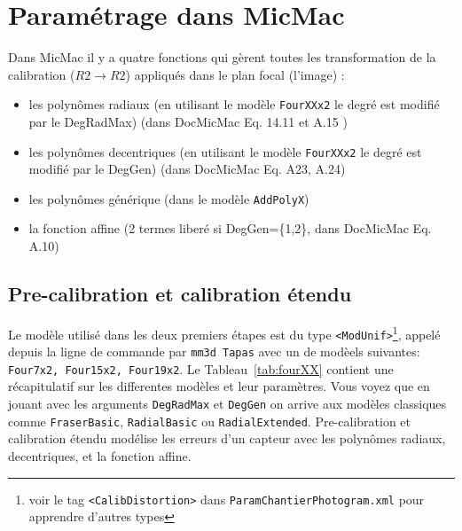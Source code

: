\documentclass[11pt,a4paper,oneside]{book}
\begin{document}
\section{Paramétrage dans MicMac}
%
Dans MicMac il y a quatre fonctions qui gèrent toutes les transformation de la calibration ($R2 \rightarrow R2$) appliqués dans le plan focal (l'image) :
\begin{itemize}
\item les polynômes radiaux (en utilisant le modèle {\tt FourXXx2} le degré est modifié par le DegRadMax) (dans DocMicMac Eq. 14.11 et A.15 )
\item les polynômes decentriques (en utilisant le modèle {\tt FourXXx2} le degré est modifié par le DegGen) (dans DocMicMac Eq. A23, A.24) 
\item les polynômes générique (dans le modèle {\tt AddPolyX})
\item la fonction affine (2 termes liberé si DegGen=\{1,2\}, dans DocMicMac Eq. A.10)
\end{itemize}
%
\subsection{Pre-calibration et calibration étendu}
%
Le modèle utilisé dans les deux premiers étapes est du type {\tt <ModUnif>}\footnote{voir le tag {\tt <CalibDistortion>} dans {\tt ParamChantierPhotogram.xml} pour apprendre d'autres types}, appelé depuis la ligne de commande par {\tt mm3d Tapas} avec un de modèels suivantes: {\tt Four7x2, Four15x2, Four19x2}. Le Tableau~\ref{tab:fourXX} contient une récapitulatif sur les differentes modèles et leur paramètres. Vous voyez que en jouant avec les arguments {\tt DegRadMax} et {\tt DegGen} on arrive aux modèles classiques comme {\tt FraserBasic}, {\tt RadialBasic} ou {\tt  RadialExtended}. Pre-calibration et calibration étendu modélise les erreurs d'un capteur avec les polynômes radiaux, decentriques, et la fonction affine.
%
\end{document}
